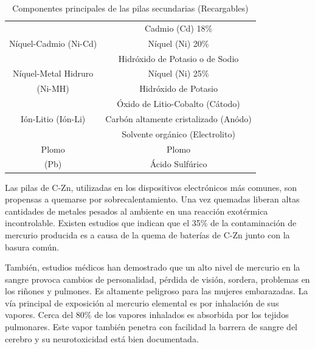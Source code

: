                 \begin{table}[!htbp]
                    \centering
                    \begin{tabular}{|c|c|}
                         \hline
                         & Cadmio (Cd) 18\%\\
                         Níquel-Cadmio (Ni-Cd) & Níquel (Ni) 20\%\\
                         & Hidróxido de Potasio o de Sodio\\
                         \hline
                         Níquel-Metal Hidruro & Níquel (Ni) 25\%\\
                         (Ni-MH) & Hidróxido de Potasio\\
                         \hline
                         & Óxido de Litio-Cobalto (Cátodo)\\
                         Ión-Litio (Ión-Li) & Carbón altamente cristalizado (Anódo)\\
                         & Solvente orgánico (Electrolito)\\
                         \hline
                         Plomo & Plomo\\
                         (Pb) & Ácido Sulfúrico\\
                         \hline
                    \end{tabular}
                    \caption{Componentes principales de las pilas secundarias (Recargables)}
                    \label{tab:2}
                \end{table}
                \newpage
                Las pilas de C-Zn, utilizadas en los dispositivos electrónicos más comunes, son propensas a quemarse por sobrecalentamiento. Una vez quemadas liberan altas cantidades de metales pesados al ambiente en una reacción exotérmica incontrolable. Existen estudios que indican que el 35\% de la contaminación de mercurio producida es a causa de la quema de baterías de C-Zn junto con la basura común.\par
                También, estudios médicos han demostrado que un alto nivel de mercurio en la sangre provoca cambios de personalidad, pérdida de visión, sordera, problemas en los riñones y pulmones. Es altamente peligroso para las mujeres embarazadas. La vía principal de exposición al mercurio elemental es por inhalación de sus vapores. Cerca del 80\% de los vapores inhalados es absorbida por los tejidos pulmonares. Este vapor también penetra con facilidad la barrera de sangre del cerebro y su neurotoxicidad está bien documentada.\par
